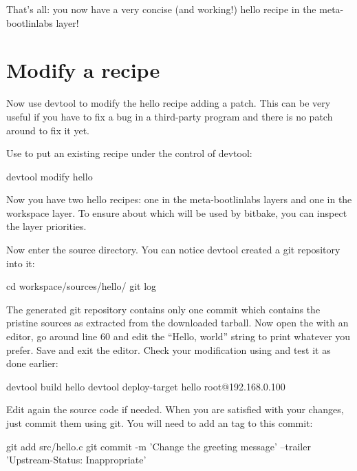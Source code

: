 That's all: you now have a very concise (and working!) hello recipe in the
meta-bootlinlabs layer!

\section{Modify a recipe}

Now use devtool to modify the hello recipe adding a patch. This can be very
useful if you have to fix a bug in a third-party program and there is no
patch around to fix it yet.

Use  to put an existing recipe under the control of devtool:
\begin{bashinput}
devtool modify hello
\end{bashinput}

Now you have two hello recipes: one in the meta-bootlinlabs layers and one
in the workspace layer. To ensure about which will be used by bitbake, you
can inspect the layer priorities.

Now enter the source directory. You can notice devtool created a git
repository into it:

\begin{bashinput}
cd workspace/sources/hello/
git log
\end{bashinput}

The generated git repository contains only one commit which contains
the pristine sources as extracted from the downloaded tarball.  Now open the
 with an editor, go around line 60 and edit the ``Hello,
world'' string to print whatever you prefer. Save and exit the
editor. Check your modification using  and
test it as done earlier:

\begin{bashinput}
devtool build hello
devtool deploy-target hello root@192.168.0.100
\end{bashinput}

Edit again the source code if needed. When you are satisfied with your
changes, just commit them using git. You will need to add an
\href{https://docs.yoctoproject.org/contributor-guide/recipe-style-guide.html#patch-upstream-status}{}
tag to this commit:

\begin{bashinput}
git add src/hello.c
git commit -m 'Change the greeting message' --trailer 'Upstream-Status: Inappropriate'
\end{bashinput}

